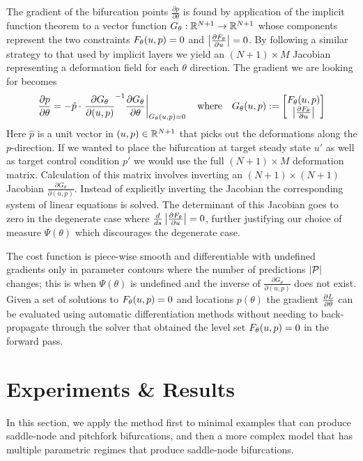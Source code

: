 \documentclass{article}
\begin{document}
The gradient of the bifurcation points $\frac{\partial p}{\partial\theta}$ is found by application of the implicit function theorem to a vector function $G_{\theta}:\mathbb{R}^{N+1}\rightarrow\mathbb{R}^{N+1}$ whose components represent the two constraints $F_{\theta}(u,p)=0$ and $\left| \frac{\partial F_{\theta}}{\partial u} \right|=0$. By following a similar strategy to that used by implicit layers \cite{Look2020DifferentiableLayers} we yield an $(N+1)\times M$ Jacobian representing a deformation field \cite{Jos2011OnSurface} for each $\theta$ direction. The gradient we are looking for becomes
\begin{align}
    \frac{\partial p}{\partial\theta} = -\hat{p}\cdot\left.\frac{\partial G_{\theta}}{\partial (u,p)}^{-1}
    \frac{\partial  G_{\theta}}{\partial\theta}\right|_{G_{\theta}(u,p)=0}
    \quad\mathrm{where}\quad
    G_{\theta}(u,p):=\begin{bmatrix}F_{\theta}(u,p)\\\left| \frac{\partial F_{\theta}}{\partial u} \right|\end{bmatrix}
    \label{eq:gradient-bifurcation}
\end{align}
Here $\hat{p}$ is a unit vector in $(u,p)\in\mathbb{R}^{N+1}$ that picks out the deformations along the $p$-direction. If we wanted to place the bifurcation at target steady state $u'$ as well as target control condition $p'$ we would use the full $(N+1)\times M$ deformation matrix. Calculation of this matrix involves inverting an $(N+1)\times(N+1)$ Jacobian $\frac{\partial G_{\theta}}{\partial(u,p)}$. Instead of explicitly inverting the Jacobian the corresponding system of linear equations is solved. The determinant of this Jacobian goes to zero in the degenerate case where $\frac{d}{ds}\left| \frac{\partial F_{\theta}}{\partial u} \right|=0$, further justifying our choice of measure $\Psi(\theta)$ which discourages the degenerate case.

The cost function is piece-wise smooth and differentiable with undefined gradients only in parameter contours where the number of predictions $|\mathcal{P}|$ changes; this is when $\Psi(\theta)$ is undefined and the inverse of $\frac{\partial G_{\theta}}{\partial (u,p)}$ does not exist. Given a set of solutions to $F_{\theta}(u,p)=0$ and locations $p(\theta)$ the gradient $\frac{\partial L}{\partial\theta}$ can be evaluated using automatic differentiation methods \cite{Revels2016Forward-ModeJulia,Innes2018FashionableFlux,Innes2018Flux:Julia} without needing to back-propagate through the solver that obtained the level set $F_{\theta}(u,p)=0$ in the forward pass.

\section{Experiments \& Results}
\label{section:results}
In this section, we apply the method first to minimal examples that can produce saddle-node and pitchfork bifurcations, and then a more complex model that has multiple parametric regimes that produce saddle-node bifurcations.
\end{document}
